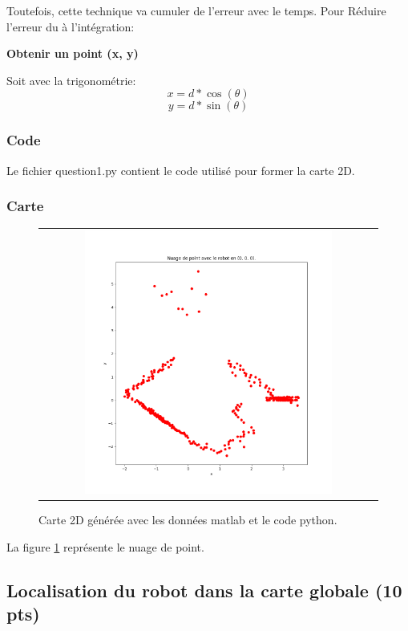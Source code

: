 \documentclass[12pt]{article}
\begin{document}
Toutefois, cette technique va cumuler de l'erreur avec le temps.
Pour Réduire l'erreur du à l'intégration:

\textbf{Obtenir un point (x, y)}

Soit avec la trigonométrie:
\[ x = d*\cos(\theta) \] \[ y = d*\sin(\theta) \]

\subsubsection{Code}
Le fichier question1.py contient le code utilisé pour former la carte 2D.
\subsubsection{Carte}

\begin{figure}[ht]
 \begin{center}
  \begin{tabular}{c}
    \includegraphics[width=0.75\textwidth]{q1-carte-local.png}
  \end{tabular}
 \end{center}
\vspace{-0.25in}
 \caption{Carte 2D générée avec les données matlab et le code python.}
    \label{carte-2d-locale}
\end{figure}

La figure \ref{carte-2d-locale} représente le nuage de point.

\newpage
\subsection{Localisation du robot dans la carte globale (10 pts)}
\end{document}
